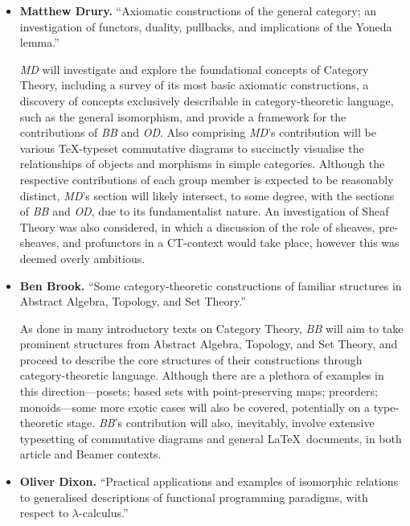 \documentclass{article}
\begin{document}
\begin{itemize}
        \item \textbf{Matthew Drury.} ``Axiomatic constructions of the general
        category; an investigation of functors, duality, pullbacks, and
        implications of the Yoneda lemma.''

        \textit{MD} will investigate and explore the foundational concepts of
        Category Theory, including a survey of its most basic axiomatic
        constructions, a discovery of concepts exclusively describable in
        category-theoretic language, such as the general isomorphism, and
        provide a framework for the contributions of \textit{BB} and
        \textit{OD}. Also comprising \textit{MD}'s contribution will be various
        \TeX-typeset commutative diagrams to succinctly visualise the
        relationships of objects and morphisms in simple categories. Although
        the respective contributions of each group member is expected to be
        reasonably distinct, \textit{MD}'s section will likely intersect, to
        some degree, with the sections of \textit{BB} and \textit{OD}, due to
        its fundamentalist nature. An investigation of Sheaf Theory was also
        considered, in which a discussion of the role of sheaves, pre-sheaves,
        and profunctors in a CT-context would take place, however this was
        deemed overly ambitious.
        \item \textbf{Ben Brook.} ``Some category-theoretic constructions of
        familiar structures in Abstract Algebra, Topology, and Set Theory.''

        As done in many introductory texts on Category Theory, \textit{BB} will
        aim to take prominent structures from Abstract Algebra, Topology, and
        Set Theory, and proceed to describe the core structures of their
        constructions through category-theoretic language. Although there are a
        plethora of examples in this direction---posets; based sets with
        point-preserving maps; preorders; monoids---some more exotic cases will
        also be covered, potentially on a type-theoretic stage. \textit{BB}'s
        contribution will also, inevitably, involve extensive typesetting of
        commutative diagrams and general \LaTeX\ documents, in both article
        and Beamer contexts.
        \item \textbf{Oliver Dixon.} ``Practical applications and examples of
        isomorphic relations to generalised descriptions of functional
        programming paradigms, with respect to $\lambda$-calculus.''


\end{itemize}
\end{document}
